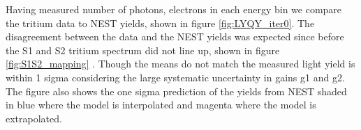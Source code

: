 Having measured number of photons, electrons in each energy bin we compare the tritium data to NEST yields, shown in figure \ref{fig:LYQY_iter0}. The disagreement between the data and the NEST yields was expected since before the S1 and S2 tritium spectrum did not line up, shown in figure \ref{fig:S1S2_mapping} . Though the means do not match the measured light yield is within 1 sigma considering the large systematic uncertainty in gains g1 and g2.  The figure also shows the one sigma prediction of the yields from NEST \cite{NEST_2013} shaded in blue where the model is interpolated and magenta where the model is extrapolated. 



\renewcommand{\baselinestretch}{1}
\small\normalsize
\begin{figure}[h!]\centering
 
\hfill
{}

\bigskip


\end{figure}

